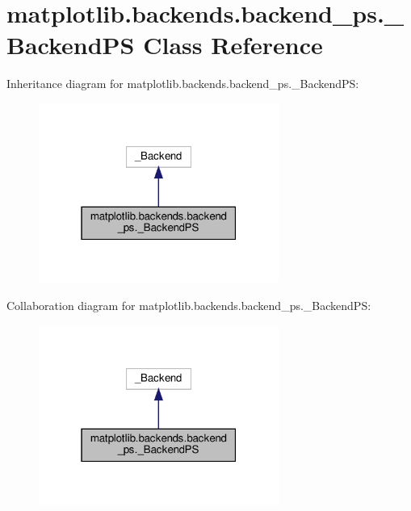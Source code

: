 \hypertarget{classmatplotlib_1_1backends_1_1backend__ps_1_1__BackendPS}{}\section{matplotlib.\+backends.\+backend\+\_\+ps.\+\_\+\+Backend\+PS Class Reference}
\label{classmatplotlib_1_1backends_1_1backend__ps_1_1__BackendPS}


Inheritance diagram for matplotlib.\+backends.\+backend\+\_\+ps.\+\_\+\+Backend\+PS\+:
\nopagebreak
\begin{figure}[H]
\begin{center}
\leavevmode
\includegraphics[width=223pt]{classmatplotlib_1_1backends_1_1backend__ps_1_1__BackendPS__inherit__graph}
\end{center}
\end{figure}


Collaboration diagram for matplotlib.\+backends.\+backend\+\_\+ps.\+\_\+\+Backend\+PS\+:
\nopagebreak
\begin{figure}[H]
\begin{center}
\leavevmode
\includegraphics[width=223pt]{classmatplotlib_1_1backends_1_1backend__ps_1_1__BackendPS__coll__graph}
\end{center}
\end{figure}
